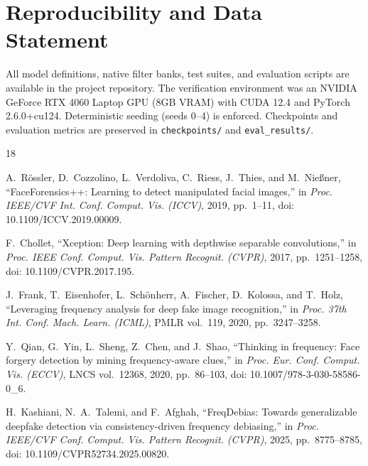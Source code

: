 \documentclass[11pt,a4paper]{article}
\providecommand{\href}[2]{#2}
\begin{document}
\section*{Reproducibility and Data Statement}
All model definitions, native filter banks, test suites, and evaluation scripts are available in the project repository. The verification environment was an NVIDIA GeForce RTX 4060 Laptop GPU (8GB VRAM) with CUDA 12.4 and PyTorch 2.6.0+cu124. Deterministic seeding (seeds 0--4) is enforced. Checkpoints and evaluation metrics are preserved in \texttt{checkpoints/} and \texttt{eval\_results/}.

\begin{thebibliography}{18}

A.~R{\"o}ssler, D.~Cozzolino, L.~Verdoliva, C.~Riess, J.~Thies, and M.~Nie{\ss}ner,
``FaceForensics++: Learning to detect manipulated facial images,''
in \textit{Proc. IEEE/CVF Int. Conf. Comput. Vis. (ICCV)}, 2019, pp.~1--11,
doi: \href{https://doi.org/10.1109/ICCV.2019.00009}{10.1109/ICCV.2019.00009}.

F.~Chollet,
``Xception: Deep learning with depthwise separable convolutions,''
in \textit{Proc. IEEE Conf. Comput. Vis. Pattern Recognit. (CVPR)}, 2017, pp.~1251--1258,
doi: \href{https://doi.org/10.1109/CVPR.2017.195}{10.1109/CVPR.2017.195}.

J.~Frank, T.~Eisenhofer, L.~Sch{\"o}nherr, A.~Fischer, D.~Kolossa, and T.~Holz,
``Leveraging frequency analysis for deep fake image recognition,''
in \textit{Proc. 37th Int. Conf. Mach. Learn. (ICML)}, PMLR vol.~119, 2020, pp.~3247--3258.

Y.~Qian, G.~Yin, L.~Sheng, Z.~Chen, and J.~Shao,
``Thinking in frequency: Face forgery detection by mining frequency-aware clues,''
in \textit{Proc. Eur. Conf. Comput. Vis. (ECCV)}, LNCS vol.~12368, 2020, pp.~86--103,
doi: \href{https://doi.org/10.1007/978-3-030-58586-0_6}{10.1007/978-3-030-58586-0\_6}.

H.~Kashiani, N.~A.~Talemi, and F.~Afghah,
``FreqDebias: Towards generalizable deepfake detection via consistency-driven frequency debiasing,''
in \textit{Proc. IEEE/CVF Conf. Comput. Vis. Pattern Recognit. (CVPR)}, 2025, pp.~8775--8785,
doi: \href{https://doi.org/10.1109/CVPR52734.2025.00820}{10.1109/CVPR52734.2025.00820}.


\end{thebibliography}
\end{document}

